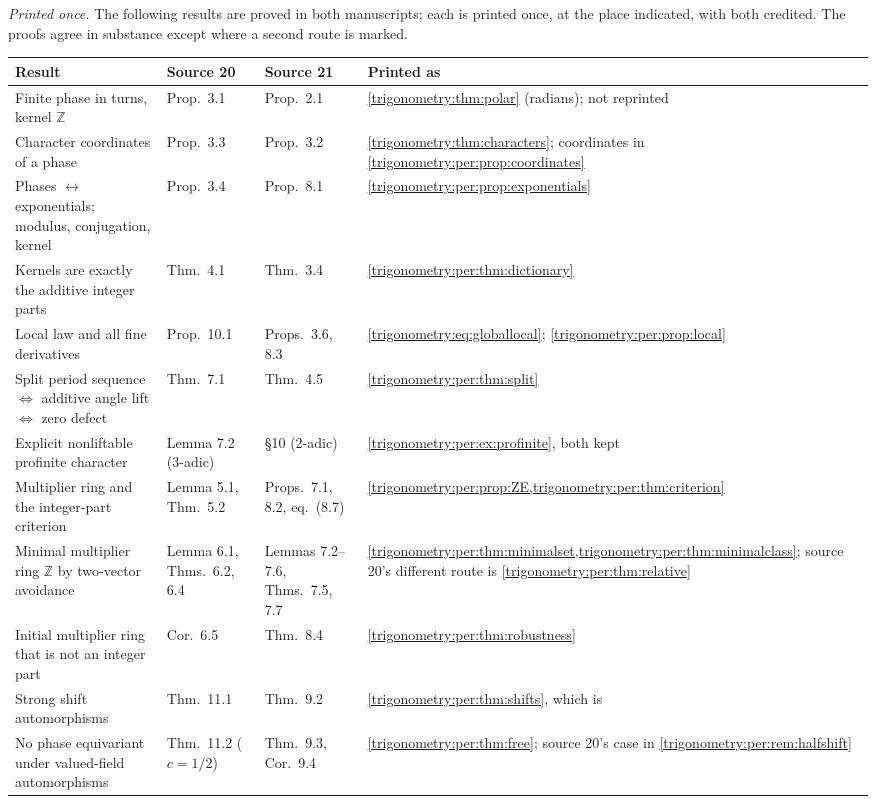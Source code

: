\documentclass[11pt,letterpaper]{article}
\numberwithin{equation}{section}
\theoremstyle{definition}
\theoremstyle{remark}
\newcommand{\Z}{\mathbb Z}
\begin{document}
\emph{Printed once.} The following results are proved in both manuscripts; each is printed once, at
the place indicated, with both credited. The proofs agree in substance except where a second route is
marked.
\begin{center}\small
\begin{longtable}{L{0.30\textwidth}L{0.17\textwidth}L{0.17\textwidth}L{0.24\textwidth}}
\toprule
Result & Source 20 & Source 21 & Printed as\\
\midrule\endhead
Finite phase in turns, kernel $\Z$ & Prop.~3.1 & Prop.~2.1 & \cref{trigonometry:thm:polar} (radians); not reprinted\\
Character coordinates of a phase & Prop.~3.3 & Prop.~3.2 & \cref{trigonometry:thm:characters}; coordinates in \cref{trigonometry:per:prop:coordinates}\\
Phases $\leftrightarrow$ exponentials; modulus, conjugation, kernel & Prop.~3.4 & Prop.~8.1 & \cref{trigonometry:per:prop:exponentials}\\
Kernels are exactly the additive integer parts & Thm.~4.1 & Thm.~3.4 & \cref{trigonometry:per:thm:dictionary}\\
Local law and all fine derivatives & Prop.~10.1 & Props.~3.6, 8.3 & \cref{trigonometry:eq:globallocal}; \cref{trigonometry:per:prop:local}\\
Split period sequence $\Leftrightarrow$ additive angle lift $\Leftrightarrow$ zero defect & Thm.~7.1 & Thm.~4.5 & \cref{trigonometry:per:thm:split}\\
Explicit nonliftable profinite character & Lemma 7.2 (3-adic) & \S10 (2-adic) & \cref{trigonometry:per:ex:profinite}, both kept\\
Multiplier ring and the integer-part criterion & Lemma 5.1, Thm.~5.2 & Props.~7.1, 8.2, eq.~(8.7) & \cref{trigonometry:per:prop:ZE,trigonometry:per:thm:criterion}\\
Minimal multiplier ring $\Z$ by two-vector avoidance & Lemma 6.1, Thms.~6.2, 6.4 & Lemmas 7.2--7.6, Thms.~7.5, 7.7 & \cref{trigonometry:per:thm:minimalset,trigonometry:per:thm:minimalclass}; source 20's different route is \cref{trigonometry:per:thm:relative}\\
Initial multiplier ring that is not an integer part & Cor.~6.5 & Thm.~8.4 & \cref{trigonometry:per:thm:robustness}\\
Strong shift automorphisms & Thm.~11.1 & Thm.~9.2 & \cref{trigonometry:per:thm:shifts}, which is \cite[Theorem 5.2]{Saut}\\
No phase equivariant under valued-field automorphisms & Thm.~11.2 ($c=1/2$) & Thm.~9.3, Cor.~9.4 & \cref{trigonometry:per:thm:free}; source 20's case in \cref{trigonometry:per:rem:halfshift}\\
\bottomrule
\end{longtable}
\end{center}
\end{document}
